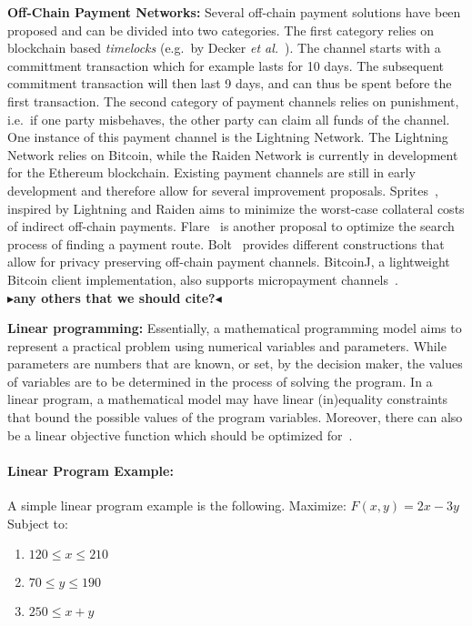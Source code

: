 \documentclass[sigconf]{acmart}
\newcommand{\todo}[1]{{\bf \color{darkred}$\blacktriangleright$#1$\blacktriangleleft$}}
\begin{document}
\noindent
\textbf{Off-Chain Payment Networks:}
Several off-chain payment solutions have been proposed and can be divided into two categories. The first category relies on blockchain based \emph{timelocks} (e.g.\ by Decker \emph{et al.}~\cite{decker2015fast}). The channel starts with a committment transaction which for example lasts for 10 days. The subsequent commitment transaction will then last 9 days, and can thus be spent before the first transaction.
The second category of payment channels relies on punishment, i.e.\ if one party misbehaves, the other party can claim all funds of the channel. One instance of this payment channel is the Lightning Network\cite{lightning}. The Lightning Network relies on Bitcoin, while the Raiden Network\cite{raiden} is currently in development for the Ethereum blockchain.
Existing payment channels are still in early development and therefore allow for several improvement proposals. Sprites~\cite{sprites}, inspired by Lightning and Raiden aims to minimize the worst-case collateral costs of indirect off-chain payments. Flare~\cite{flare} is another proposal to optimize the search process of finding a payment route. Bolt~\cite{green2016bolt} provides different constructions that allow for privacy preserving off-chain payment channels. BitcoinJ, a lightweight Bitcoin client implementation, also supports micropayment channels~\cite{bitcoinj}.\\

\todo{any others that we should cite?}

\noindent
\textbf{Linear programming:}
Essentially, a mathematical programming model aims to represent a practical problem using numerical variables and parameters. While parameters are numbers that are known, or set, by the decision maker, the values of variables are to be determined in the process of solving the program.
In a linear program, a mathematical model may have linear (in)equality constraints that bound the possible values of the program variables. Moreover, there can also be a linear objective function which should be optimized for~\cite{dantzig1990origins}.

\paragraph{Linear Program Example:}
A simple linear program example is the following. Maximize: $F(x, y) = 2x - 3y$ Subject to:

\begin{enumerate}
    \item $120 \leq x \leq 210$
    \item $70 \leq y \leq 190$
    \item $250 \leq x + y$
\end{enumerate}
\end{document}
